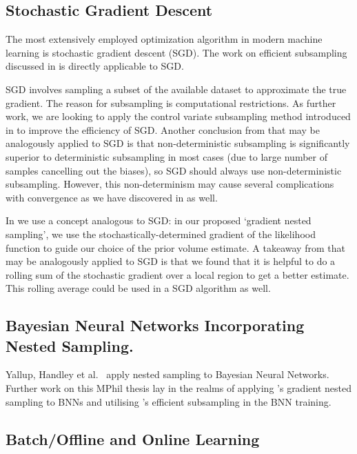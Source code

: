 \subsection{Stochastic Gradient Descent}


The most extensively employed optimization algorithm in modern machine learning is stochastic gradient descent (SGD). The work on efficient subsampling discussed in  is directly applicable to SGD.

SGD involves sampling a subset of the available dataset to approximate the true gradient. The reason for subsampling is computational restrictions. As further work, we are looking to apply the control variate subsampling method introduced in  to improve the efficiency of SGD. Another conclusion from  that may be analogously applied to SGD is that non-deterministic subsampling is significantly superior to deterministic subsampling in most cases (due to large number of samples cancelling out the biases), so SGD should always use non-deterministic subsampling. However, this non-determinism may cause several complications with convergence as we have discovered in  as well.


In  we use a concept analogous to SGD: in our proposed `gradient nested sampling', we use the stochastically-determined gradient of the likelihood function to guide our choice of the prior volume estimate. A takeaway from  that may be analogously applied to SGD is that we found that it is helpful to do a rolling sum of the stochastic gradient over a local region to get a better estimate. This rolling average could be used in a SGD algorithm as well.

\subsection{Bayesian Neural Networks Incorporating Nested Sampling.}


Yallup, Handley et al.~\cite{https://doi.org/10.48550/arxiv.2205.11151} apply nested sampling to Bayesian Neural Networks. Further work on this MPhil thesis lay in the realms of applying 's gradient nested sampling to BNNs and utilising 's efficient subsampling in the BNN training.


\subsection{Batch/Offline and Online Learning}


